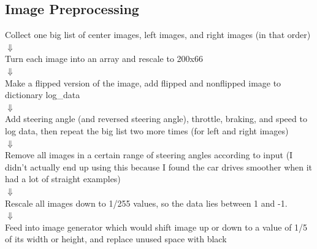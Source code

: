 \documentclass[letterpaper,12pt]{article}
\begin{document}
	\subsection*{Image Preprocessing}
	\begin{center}


		Collect one big list of center images, left images, and right  images (in that order)\\
		$\Downarrow$\\
		Turn each image into an array and rescale to 200x66\\
		$\Downarrow$\\
		Make a flipped version of the image, add flipped and nonflipped image to dictionary log\_data\\
		$\Downarrow$\\
		Add steering angle (and reversed steering angle), throttle, braking, and speed to log data, then repeat the big list two more times (for left and right images)\\
		$\Downarrow$\\
		Remove all images in a certain range of steering angles according to input (I didn't actually end up using this because I found the car drives smoother when it had a lot of straight examples)\\
		$\Downarrow$\\
		Rescale all images down to 1/255 values, so the data lies between 1 and -1.\\
		$\Downarrow$\\
		Feed into image generator which would shift image up or down to a value of 1/5 of its width or height, and replace unused space with black\\

	\end{center}
\end{document}
